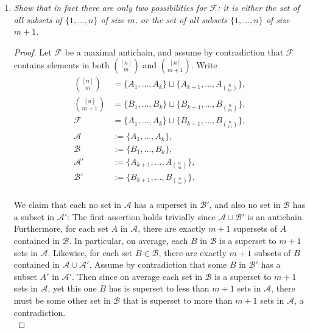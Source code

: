 \documentclass{article}
\begin{document}
\begin{enumerate}
\begin{enumerate}
      \item \it Show that in fact there are only two possibilities for
        $\mathcal{F}$: it is either the set of all subsets of
        $\{1,\ldots,n\}$ of size $m$, or the set of all subsets
        $\{1,\ldots,n\}$ of size $m+1$.

        \begin{proof}
          Let $\mathcal{F}$ be a maximal antichain, and assume by
          contradiction that $\mathcal{F}$ contains elements in both
          $\binom{[n]}{m}$ and $\binom{[n]}{m+1}$. Write
          \begin{align*}
            \binom{[n]}{m} &=\{A_1,\ldots,A_k\} \sqcup
              \{A_{k+1},\ldots,A_{\binom{n}{m}}\},\\
            \binom{[n]}{m+1} &=\{B_1,\ldots,B_k\} \sqcup
              \{B_{k+1},\ldots,B_{\binom{n}{m}}\},\\
            \mathcal{F} &=\{A_1,\ldots,A_k\} \sqcup
              \{B_{k+1},\ldots,B_{\binom{n}{m}}\},\\
            \mathcal{A} &:=\{A_1,\ldots,A_k\},\\
            \mathcal{B} &:=\{B_1,\ldots,B_k\},\\
            \mathcal{A}' &:=\{A_{k+1},\ldots,A_{\binom{n}{m}}\},\\
            \mathcal{B}' &:=\{B_{k+1},\ldots,B_{\binom{n}{m}}\}.\\
          \end{align*}

          We claim that each no set in $\mathcal{A}$ has a superset in
          $\mathcal{B}'$, and also no set in $\mathcal{B}$ has a subset in
          $\mathcal{A}'$: The first assertion holds trivially since
          $\mathcal{A}\cup\mathcal{B}'$ is an antichain. Furthermore, for
          each set $A$ in $\mathcal{A}$, there are exactly $m+1$ supersets
          of $A$ contained in $\mathcal{B}$. In particular, on average,
          each $B$ in $\mathcal{B}$ is a superset to $m+1$ sets in
          $\mathcal{A}$. Likewise, for each set $B\in\mathcal{B}$, there
          are exactly $m+1$ subsets of $B$ contained in
          $\mathcal{A}\cup\mathcal{A}'$. Assume by contradiction that some
          $B$ in $\mathcal{B}'$ has a subset $A'$ in $\mathcal{A}'$. Then
          since on average each set in $\mathcal{B}$ is a superset to $m+1$
          sets in $\mathcal{A}$, yet this one $B$ has is superset to less
          than $m+1$ sets in $\mathcal{A}$, there must be some other set in
          $\mathcal{B}$ that is superset to more than $m+1$ sets in
          $\mathcal{A}$, a contradiction. \\


\end{proof}
\end{enumerate}
\end{enumerate}
\end{document}
